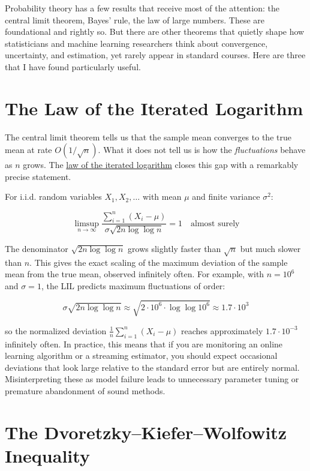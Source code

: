 \documentclass[11pt]{article}
\begin{document}
Probability theory has a few results that receive most of the attention: the central limit theorem, Bayes' rule, the law of large numbers. These are foundational and rightly so. But there are other theorems that quietly shape how statisticians and machine learning researchers think about convergence, uncertainty, and estimation, yet rarely appear in standard courses. Here are three that I have found particularly useful.

\section{The Law of the Iterated Logarithm}\label{the-law-of-the-iterated-logarithm}

The central limit theorem tells us that the sample mean converges to the true mean at rate \(O(1/\sqrt{n})\). What it does not tell us is how the \emph{fluctuations} behave as \(n\) grows. The \href{https://en.wikipedia.org/wiki/Law_of_the_iterated_logarithm}{law of the iterated logarithm} closes this gap with a remarkably precise statement.

For i.i.d. random variables \(X_1, X_2, \ldots\) with mean \(\mu\) and finite variance \(\sigma^2\):

\[\limsup_{n \to \infty} \frac{\sum_{i=1}^n (X_i - \mu)}{\sigma \sqrt{2n \log \log n}} = 1 \quad \text{almost surely}\]

The denominator \(\sqrt{2n \log \log n}\) grows slightly faster than \(\sqrt{n}\) but much slower than \(n\). This gives the exact scaling of the maximum deviation of the sample mean from the true mean, observed infinitely often. For example, with \(n = 10^6\) and \(\sigma = 1\), the LIL predicts maximum fluctuations of order:

\[\sigma \sqrt{2n \log \log n} \approx \sqrt{2 \cdot 10^6 \cdot \log \log 10^6} \approx 1.7 \cdot 10^3\]

so the normalized deviation \(\frac{1}{n}\sum_{i=1}^n (X_i - \mu)\) reaches approximately \(1.7 \cdot 10^{-3}\) infinitely often. In practice, this means that if you are monitoring an online learning algorithm or a streaming estimator, you should expect occasional deviations that look large relative to the standard error but are entirely normal. Misinterpreting these as model failure leads to unnecessary parameter tuning or premature abandonment of sound methods.

\section{The Dvoretzky--Kiefer--Wolfowitz Inequality}\label{the-dvoretzkykieferwolfowitz-inequality}
\end{document}
